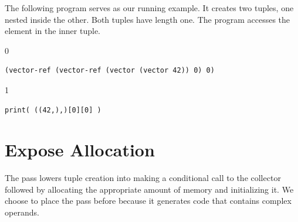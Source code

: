 \documentclass[7x10]{TimesAPriori_MIT}%
\def\racketEd{0}
\def\pythonEd{1}
\def\edition{1}
\newcommand{\pythonColor}[0]{}
\numberwithin{theorem}{chapter}
\numberwithin{definition}{chapter}
\numberwithin{equation}{chapter}
\begin{document}
The following program serves as our running example.  It creates
two tuples, one nested inside the other. Both tuples have length
one. The program accesses the element in the inner tuple.
{\if\edition\racketEd
\begin{lstlisting}
(vector-ref (vector-ref (vector (vector 42)) 0) 0)
\end{lstlisting}
\fi}
{\if\edition\pythonEd\pythonColor
\begin{lstlisting}
print( ((42,),)[0][0] )
\end{lstlisting}
\fi}





\section{Expose Allocation}
\label{sec:expose-allocation}

The pass  lowers tuple creation into making a
conditional call to the collector followed by allocating the
appropriate amount of memory and initializing it.  We choose to place
the  pass before
 because it generates
code that contains complex operands.
\end{document}
